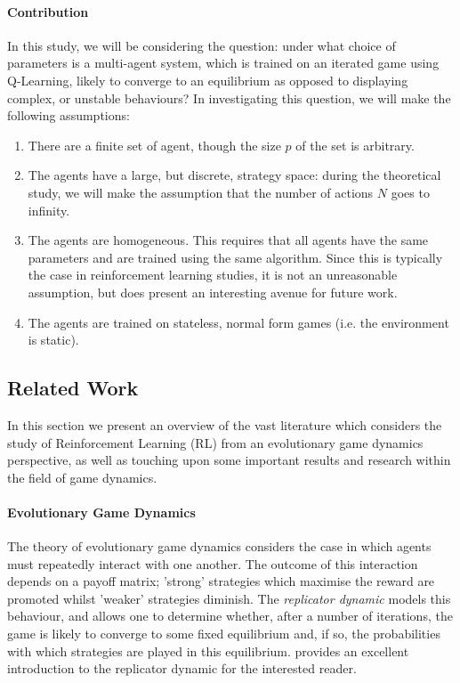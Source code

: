 \documentclass[sigconf]{aamas}
\begin{document}
\paragraph{Contribution}
In this study, we will be considering the question: under what choice of parameters is a
multi-agent system, which is trained on an iterated game using Q-Learning, likely to converge to an
equilibrium as opposed to displaying complex, or unstable behaviours? In investigating this question, we will make the
following assumptions:

\begin{enumerate}
    \item There are a finite set of agent, though the size $p$ of the set is arbitrary. 
    \item The agents have a large, but discrete, strategy space: during the theoretical study, we
    will make the assumption that the number of actions $N$ goes to infinity.
    \item The agents are homogeneous. This requires that all agents have the same parameters and are
    trained using the same algorithm. Since this is typically the case in reinforcement learning
    studies, it is not an unreasonable assumption, but does present an interesting avenue for future
    work.
    \item The agents are trained on stateless, normal form games (i.e. the environment is static).
\end{enumerate}


\subsection{Related Work}

In this section we present an overview of the vast literature which considers the study of Reinforcement Learning (RL) from an evolutionary game dynamics perspective, as well as touching upon some important results and research within the field of game dynamics.

\paragraph{Evolutionary Game Dynamics} The theory of evolutionary game dynamics \cite{Morgenstern44} considers the case in which agents must repeatedly interact with one another. The outcome of this interaction depends on a payoff matrix; 'strong' strategies which maximise the reward are promoted whilst 'weaker' strategies diminish. The \textit{replicator dynamic} models this behaviour, and allows one to determine whether, after a number of iterations, the game is likely to converge to some fixed equilibrium and, if so, the probabilities with which strategies are played in this equilibrium. \cite{ShohamMultiagentFoundations} provides an excellent introduction to the replicator dynamic for the interested reader.
\end{document}
